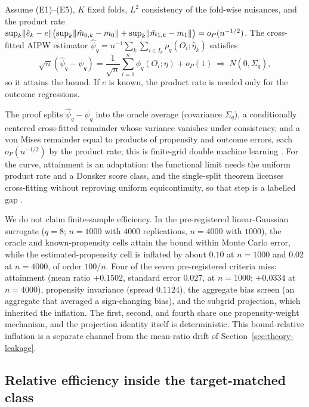 \begin{theorem}
\label{thm:eff-attainment}
Assume (E1)--(E5), $K$ fixed folds, $L^2$ consistency of the fold-wise nuisances, and the product rate $\sup_k\lVert \hat e_k-e\rVert\bigl(\sup_k\lVert \hat m_{0,k}-m_0\rVert+\sup_k\lVert \hat m_{1,k}-m_1\rVert\bigr)=o_P(n^{-1/2})$. The cross-fitted AIPW estimator $\hat\psi_q=n^{-1}\sum_k\sum_{i\in I_k}\rho_q(O_i;\hat\eta_k)$ satisfies
\[
\sqrt n(\hat\psi_q-\psi_q)=\frac{1}{\sqrt n}\sum_{i=1}^n\phi_q(O_i;\eta)+o_P(1)\ \Rightarrow\ N(0,\Sigma_q),
\]
so it attains the bound. If $e$ is known, the product rate is needed only for the outcome regressions.
\end{theorem}
The proof splits $\hat\psi_q-\psi_q$ into the oracle average (covariance $\Sigma_q$), a conditionally centered cross-fitted remainder whose variance vanishes under consistency, and a von Mises remainder equal to products of propensity and outcome errors, each $o_P(n^{-1/2})$ by the product rate; this is finite-grid double machine learning \cite{chernozhukov_dml_2018,new_robins_2018}. For the curve, attainment is an adaptation: the functional limit needs the uniform product rate and a Donsker score class, and the single-split theorem licenses cross-fitting without reproving uniform equicontinuity, so that step is a labelled gap \cite{kim_lee_tce_2026,kennedy_review_2022}.

We do not claim finite-sample efficiency. In the pre-registered linear-Gaussian surrogate ($q=8$; $n=1000$ with $4000$ replications, $n=4000$ with $1000$), the oracle and known-propensity cells attain the bound within Monte Carlo error, while the estimated-propensity cell is inflated by about $0.10$ at $n=1000$ and $0.02$ at $n=4000$, of order $100/n$. Four of the seven pre-registered criteria miss: attainment (mean ratio $+0.1502$, standard error $0.027$, at $n=1000$; $+0.0334$ at $n=4000$), propensity invariance (spread $0.1124$), the aggregate bias screen (an aggregate that averaged a sign-changing bias), and the subgrid projection, which inherited the inflation. The first, second, and fourth share one propensity-weight mechanism, and the projection identity itself is deterministic. This bound-relative inflation is a separate channel from the mean-ratio drift of Section~\ref{sec:theory-leakage}.

\subsection{Relative efficiency inside the target-matched class}
\label{subsec:are}

